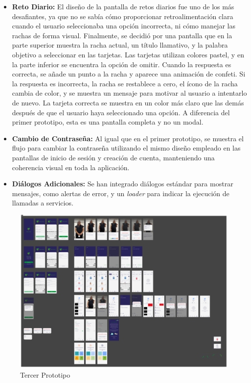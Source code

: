 \begin{itemize}
    \item \textbf{Reto Diario:} El diseño de la pantalla de retos diarios fue uno de los más desafiantes, ya que no se sabía cómo proporcionar retroalimentación clara cuando el usuario seleccionaba una opción incorrecta, ni cómo manejar las rachas de forma visual. Finalmente, se decidió por una pantalla que en la parte superior muestra la racha actual, un título llamativo, y la palabra objetivo a seleccionar en las tarjetas. Las tarjetas utilizan colores pastel, y en la parte inferior se encuentra la opción de omitir. Cuando la respuesta es correcta, se añade un punto a la racha y aparece una animación de confeti. Si la respuesta es incorrecta, la racha se restablece a cero, el ícono de la racha cambia de color, y se muestra un mensaje para motivar al usuario a intentarlo de nuevo. La tarjeta correcta se muestra en un color más claro que las demás después de que el usuario haya seleccionado una opción. A diferencia del primer prototipo, esta es una pantalla completa y no un modal.

     \item \textbf{Cambio de Contraseña:} Al igual que en el primer prototipo, se muestra el flujo para cambiar la contraseña utilizando el mismo diseño empleado en las pantallas de inicio de sesión y creación de cuenta, manteniendo una coherencia visual en toda la aplicación.

    \item \textbf{Diálogos Adicionales:} Se han integrado diálogos estándar para mostrar mensajes, como alertas de error, y un \textit{loader} para indicar la ejecución de llamadas a servicios. 
        
\end{itemize}

\begin{figure} [H]
    \centering
    \includegraphics[width=1\linewidth]{figuras/tercer_prototipo.png}
    \caption{Tercer Prototipo}
    \label{fig:enter-label}
\end{figure}



